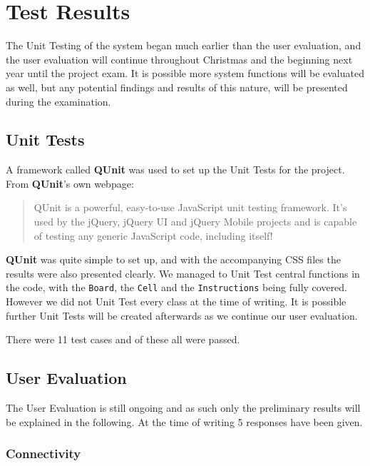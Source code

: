 \section{Test Results}
\label{sec:testresults}

The Unit Testing of the system began much earlier than the user evaluation, and the user evaluation will continue throughout Christmas and the beginning next year until the project exam. It is possible more system functions will be evaluated as well, but any potential findings and results of this nature, will be presented during the examination.

\subsection{Unit Tests}

A framework called \textbf{QUnit} was used to set up the Unit Tests for the project.
From \textbf{QUnit}'s own webpage:

\begin{quotation}
QUnit is a powerful, easy-to-use JavaScript unit testing framework. It's used by the jQuery, jQuery UI and jQuery Mobile projects and is capable of testing any generic JavaScript code, including itself!\cite{qunit}
\end{quotation}

\textbf{QUnit} was quite simple to set up, and with the accompanying CSS files the results were also presented clearly. We managed to Unit Test central functions in the code, with the \texttt{Board}, the \texttt{Cell} and the \texttt{Instructions} being fully covered.  However we did not Unit Test every class at the time of writing. It is possible further Unit Tests will be created afterwards as we continue our user evaluation.

There were 11 test cases and of these all were passed. 

\subsection{User Evaluation}

The User Evaluation is still ongoing and as such only the preliminary results will be explained in the following. At the time of writing 5 responses have been given.


\subsubsection{Connectivity}

